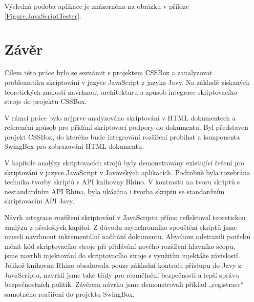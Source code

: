 Výsledná podoba aplikace je znázorněna na obrázku v příloze \ref{Figure.JavaScriptTester}.

\chapter{Závěr}
\label{Chapter.Final}

Cílem této práce bylo se seznámit s projektem CSSBox a zanalyzovat problematiku skriptování v jazyce JavaScript z jazyka Javy. Na základě získaných teoretických znalostí navrhnout architekturu a způsob integrace skriptovacího stroje do projektu CSSBox.

V rámci práce bylo nejprve analyzováno skriptování v HTML dokumentech a referenční způsob pro přidání skriptovací podpory do dokumentu. Byl představen projekt CSSBox, do kterého bude integrování rozšíření probíhat a komponenta SwingBox pro zobrazování HTML dokumentu.

V kapitole analýzy skriptovacích strojů byly demonstrovány existující řešení pro skriptování v jazyce JavaScript v Javovských aplikacích. Podrobně byla rozebrána technika tvorby skriptů s API knihovny Rhino. V kontrastu na tvoru skriptů s nestandardním API Rhina, byla ukázána i tvorba skriptu se standardním skriptovacím API Javy.

Návrh integrace rozšíření skriptování v JavaScriptu přímo reflektoval teoretickou analýzu z předešlých kapitol. Z důvodu asynchronního spouštění skriptů jsme museli navrhnout inkrementální načítání dokumentu. Abychom odstranili potřebu měnit kód skriptovacího stroje při přidávání nového rozšíření hlavního scopu, jsme navrhli injektování do skriptovacího stroje s využitím injektáže závislostí. Jelikož knihovna Rhino obsahovala pouze základní kontrolu přístupu do Javy z JavaScriptu, navrhli jsme také třídy pro rozmělnění bezpečnosti a lepší správu bezpečnostních politik. Závěrem návrhu jsme demonstrovali příklad „registrace“ samotného rozšíření do projektu SwingBox.
